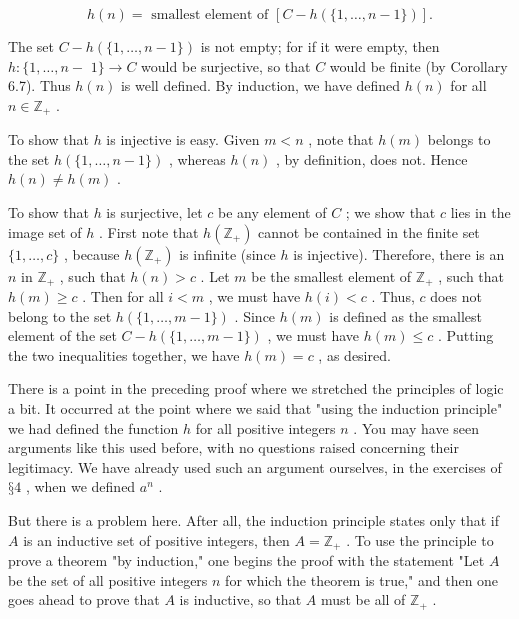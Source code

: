 \[
h\left( n\right)  = \text{ smallest element of }\left\lbrack  {C - h\left( {\{ 1,\ldots ,n - 1\} }\right) }\right\rbrack  .
\]

The set \(C - h\left( {\{ 1,\ldots ,n - 1\} }\right)\) is not empty; for if it were empty, then \(h : \{ 1,\ldots ,n -\)  \(1\}  \rightarrow  C\) would be surjective, so that \(C\) would be finite (by Corollary 6.7). Thus \(h\left( n\right)\) is well defined. By induction, we have defined \(h\left( n\right)\) for all \(n \in  {\mathbb{Z}}_{ + }\) .

To show that \(h\) is injective is easy. Given \(m < n\) , note that \(h\left( m\right)\) belongs to the set \(h\left( {\{ 1,\ldots ,n - 1\} }\right)\) , whereas \(h\left( n\right)\) , by definition, does not. Hence \(h\left( n\right)  \neq  h\left( m\right)\) .

To show that \(h\) is surjective, let \(c\) be any element of \(C\) ; we show that \(c\) lies in the image set of \(h\) . First note that \(h\left( {\mathbb{Z}}_{ + }\right)\) cannot be contained in the finite set \(\{ 1,\ldots ,c\}\) , because \(h\left( {\mathbb{Z}}_{ + }\right)\) is infinite (since \(h\) is injective). Therefore, there is an \(n\) in \({\mathbb{Z}}_{ + }\) , such that \(h\left( n\right)  > c\) . Let \(m\) be the smallest element of \({\mathbb{Z}}_{ + }\) , such that \(h\left( m\right)  \geq  c\) . Then for all \(i < m\) , we must have \(h\left( i\right)  < c\) . Thus, \(c\) does not belong to the set \(h\left( {\{ 1,\ldots ,m - 1\} }\right)\) . Since \(h\left( m\right)\) is defined as the smallest element of the set \(C - h\left( {\{ 1,\ldots ,m - 1\} }\right)\) , we must have \(h\left( m\right)  \leq  c\) . Putting the two inequalities together, we have \(h\left( m\right)  = c\) , as desired.

There is a point in the preceding proof where we stretched the principles of logic a bit. It occurred at the point where we said that "using the induction principle" we had defined the function \(h\) for all positive integers \(n\) . You may have seen arguments like this used before, with no questions raised concerning their legitimacy. We have already used such an argument ourselves, in the exercises of \(§4\) , when we defined \({a}^{n}\) .

But there is a problem here. After all, the induction principle states only that if \(A\) is an inductive set of positive integers, then \(A = {\mathbb{Z}}_{ + }\) . To use the principle to prove a theorem "by induction," one begins the proof with the statement "Let \(A\) be the set of all positive integers \(n\) for which the theorem is true," and then one goes ahead to prove that \(A\) is inductive, so that \(A\) must be all of \({\mathbb{Z}}_{ + }\) .

